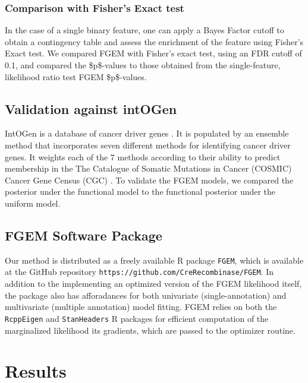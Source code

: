 \subsubsection{Comparison with Fisher's Exact test}\label{sec:orge6f1632}

In the case of a single binary feature, one can apply a Bayes Factor cutoff to obtain a contingency table and assess the enrichment of the feature using Fisher's Exact test.
We compared FGEM with Fisher's exact test, using an FDR cutoff of 0.1, and compared the \$p\$-values to those obtained from the single-feature, likelihood ratio test FGEM \$p\$-values.

\subsection{Validation against intOGen}\label{sec:orgd8b4e10}

IntOGen is a database of cancer driver genes \cite{gonzalez-perez13_intog_mutat_ident_cancer_driver}.  It is populated by an ensemble method that incorporates seven different methods for identifying cancer driver genes.  
It weights each of the 7 methods according to their ability to predict membership in the The Catalogue of Somatic Mutations in Cancer (COSMIC) Cancer Gene Census (CGC) \cite{COSMIC}.
To validate the FGEM models, we compared the posterior under the functional model to the functional posterior under the uniform model.


\subsection{FGEM Software Package}\label{sec:org56b3320}

Our method is distributed as a freely available R package \cite{Rlang} \texttt{FGEM}, which is available at the GitHub repository \texttt{https://github.com/CreRecombinase/FGEM}.  In addition to the implementing an optimized version of the FGEM likelihood itself, the package also has afforadances for both univariate (single-annotation) and multivariate (multiple annotation) model fitting.  FGEM relies on both the \texttt{RcppEigen} \cite{RcppEigen} and  \texttt{StanHeaders} R packages for efficient computation of the marginalized likelihood its gradients, which are passed to the optimizer routine.  


\section{Results}\label{sec:org6fb4837}

